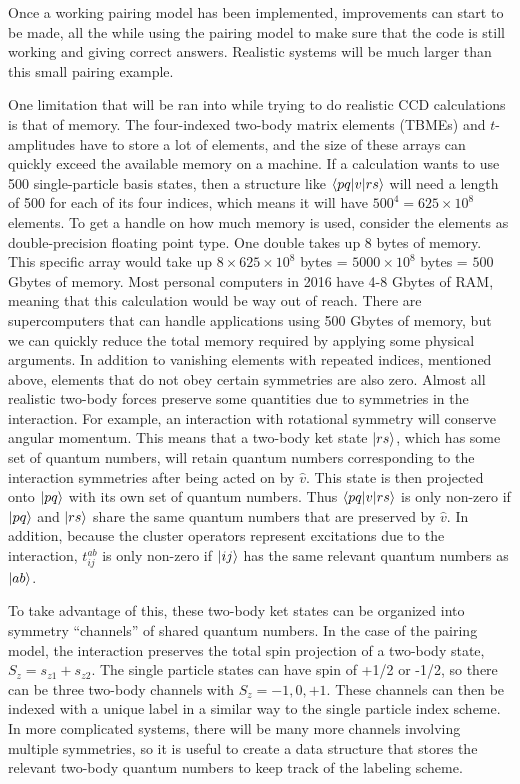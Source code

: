   Once a working pairing model has been implemented, improvements can
  start to be made, all the while using the pairing model to make sure
  that the code is still working and giving correct answers. Realistic
  systems will be much larger than this small pairing example.

  One limitation that will be ran into while trying to do realistic
  CCD calculations is that of memory. The four-indexed two-body matrix elements (TBMEs) and
  $t$-amplitudes have to store a lot of elements, and the size of these
  arrays can quickly exceed the available memory on
  a machine. If a calculation wants to use 500 single-particle basis states, then
  a structure like $\braket{pq|v|rs}$ will need a  length of 500 for each of
  its four indices, which means it will have $500^4 = 625\times 10^8$
  elements. To get a handle on how much memory is used, consider the
  elements as double-precision floating point type. One double takes
  up 8 bytes of memory. This specific array would take up $8\times 625\times 10^8$ bytes
  = $5000 \times 10^8$ bytes = $500$ Gbytes of memory. Most personal
  computers in 2016 have 4-8 Gbytes of RAM, meaning that this calculation would
  be way out of reach. There are supercomputers that can handle
  applications using 500 Gbytes of memory, but we can quickly reduce
  the total memory required by applying some physical arguments. In
  addition to vanishing elements with repeated indices, mentioned
  above, elements that do not obey certain symmetries are also
  zero. Almost all realistic two-body forces preserve some quantities
  due to symmetries in the interaction. For example, an interaction
  with rotational symmetry will conserve angular momentum. This means
  that a two-body ket state $\ket{rs}$, which has some set of quantum
  numbers, will retain quantum numbers corresponding to the
  interaction symmetries after being acted on by $\hat{v}$. This state
  is then projected onto $\ket{pq}$ with its own set of quantum
  numbers. Thus $\braket{pq|v|rs}$ is only non-zero if $\ket{pq}$ and
  $\ket{rs}$ share the same quantum numbers that are preserved by
  $\hat{v}$. In addition, because the cluster operators represent
  excitations due to the interaction, $t_{ij}^{ab}$ is only non-zero
  if $\ket{ij}$ has the same relevant quantum numbers as $\ket{ab}$.

  To take advantage of this, these two-body ket states can be
  organized into symmetry ``channels'' of shared quantum numbers. In the case
  of the pairing model, the interaction preserves the total spin
  projection of a two-body state, $S_{z}=s_{z1}+s_{z2}$. The single
  particle states can have spin of +1/2 or -1/2, so there can be three
  two-body channels with $S_{z}=-1,0,+1$. These channels can then be
  indexed with a unique label in a similar way to the single particle
  index scheme. In more complicated systems, there will be many more
  channels involving multiple symmetries, so it is useful to create a
  data structure that stores the relevant two-body quantum numbers to
  keep track of the labeling scheme.

